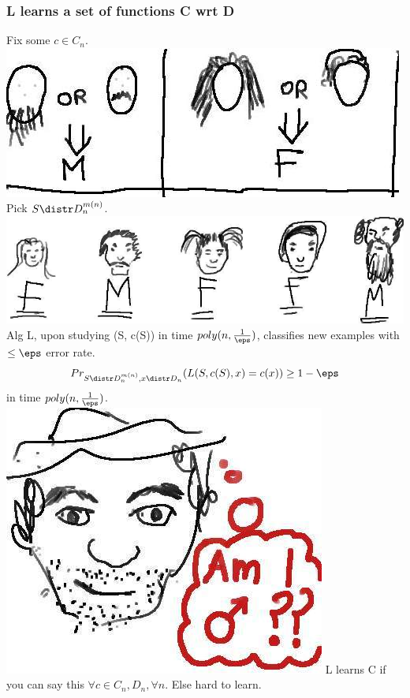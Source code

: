 \documentclass{beamer}
\begin{document}
\begin{frame}
\frametitle{L learns a set of functions C wrt D}
\begin{itemize}
\pitem Fix some $c \in C_{n}$. \includegraphics[scale=0.15]{images/concepts.jpg}
\pitem Pick $S \distr D_{n}^{m(n)}$. \includegraphics[scale=0.15]{images/classifiedFaces.jpg}
\pitem Alg L, upon studying (S, c(S)) in time $poly(n, \frac{1}{\eps})$, classifies new examples with $\leq \eps$ error rate.
\pitem $$Pr_{S \distr D_{n}^{m(n)}, x \distr D_{n}}(L(S, c(S), x) = c(x)) \geq 1 - \eps$$ in time $poly(n, \frac{1}{\eps})$.
\includegraphics[scale=0.065]{images/maleFace.jpg}
\pitem L learns C if you can say this $\forall c \in C_{n}, D_{n}, \forall n$.
\pitem Else hard to learn.
\end{itemize}
\end{frame}
\end{document}
